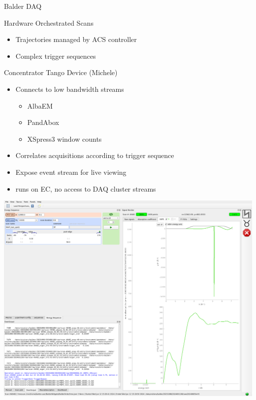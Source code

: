 \documentclass[aspectratio=169]{beamer}
\begin{document}
\begin{frame}{Balder DAQ}
\begin{minipage}{0.59\textwidth}
\begin{block}{Hardware Orchestrated Scans}
 \begin{itemize}
  \item Trajectories managed by ACS controller
  \item Complex trigger sequences
 \end{itemize}
\end{block}

\begin{block}{Concentrator Tango Device (Michele)}
\begin{itemize}
 \item Connects to low bandwidth streams
 \begin{itemize}
  \item AlbaEM
  \item PandAbox
  \item XSpress3 window counts
 \end{itemize}
 \item Correlates acquisitions according to trigger sequence
 \item Expose event stream for live viewing
 \item runs on EC, no access to DAQ cluster streams
\end{itemize}

\end{block}
\end{minipage}
\begin{minipage}{0.39\textwidth}
 \includegraphics[width=\textwidth]{img/balder}
\end{minipage}
\end{frame}
\end{document}
